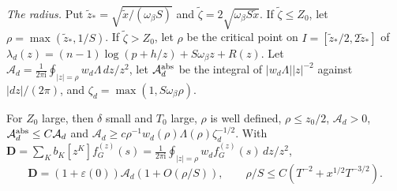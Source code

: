 \emph{The radius.} Put $\tilde z_*=\sqrt{\tilde x/(\omega_\beta S)}$ and
$\tilde\zeta=2\sqrt{\omega_\beta S\tilde x}$. If $\tilde\zeta\le Z_0$, let $\rho=\max(\tilde z_*,1/S)$.
If $\tilde\zeta>Z_0$, let $\rho$ be the critical point on $I=[\tilde z_*/2,2\tilde z_*]$ of
$\lambda_d(z)=(n-1)\log(p+h/z)+S\omega_\beta z+R(z)$. Let
$\mathcal A_d=\frac1{2\pi\mathrm i}\oint_{|z|=\rho}w_d\Lambda\,dz/z^2$, let $\mathcal A_d^{\rm abs}$ be
the integral of $|w_d\Lambda||z|^{-2}$ against $|dz|/(2\pi)$, and $\zeta_d=\max(1,S\omega_\beta\rho)$.

\begin{lemma}\label{lem:counts-contour}
For $Z_0$ large, then $\delta$ small and $T_0$ large, $\rho$ is well defined, $\rho\le z_0/2$,
$\mathcal A_d>0$, $\mathcal A_d^{\rm abs}\le C\mathcal A_d$ and
$\mathcal A_d\ge c\rho^{-1}w_d(\rho)\Lambda(\rho)\zeta_d^{-1/2}$. With
$\mathbf D=\sum_Kb_K[z^K]f^{(z)}_G(s)=\frac1{2\pi\mathrm i}\oint_{|z|=\rho}w_df^{(z)}_G(s)\,dz/z^2$,
\[
\mathbf D=(1+\varepsilon(0))\mathcal A_d(1+O(\rho/S)),\qquad\rho/S\le C(T^{-2}+x^{1/2}T^{-3/2}).
\]
\end{lemma}

